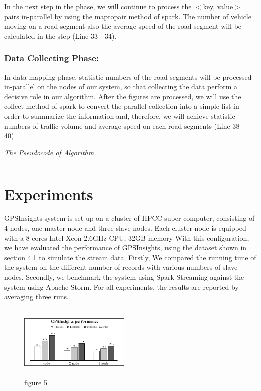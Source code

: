 \documentclass{acm_proc_article-sp}
\begin{document}
\setlength{\parindent}{0.7cm} In the next step in the phase, we will continue to process the $<$key, value$>$ pairs in-parallel by using the maptopair method of spark. The number of vehicle moving on a road segment also the average speed of the road segment will be calculated in the step (Line 33 - 34).

\subsubsection{Data Collecting Phase:} In data mapping phase, statistic numbers of the road segments will be processed in-parallel on the nodes of our system, so that collecting the data perform a decisive role in our algorithm. After the figures are processed, we will use the collect method of spark to convert the parallel collection into a simple list in order to summarize the information and, therefore, we will achieve statistic numbers of traffic volume and average speed on each road segments (Line 38 - 40).


{\it The Pseudocode of Algorithm}	
\begin{verbatim}

\end{verbatim}
%
\noindent

\section{Experiments}
	GPSInsights system is set up on a cluster of HPCC super computer, consisting of 4 nodes, one master node and three slave nodes. Each cluster node is equipped with a  8-cores Intel Xeon 2.6GHz CPU, 32GB memory 
	With this configuration, we have evaluated the performance of GPSInsights, using the dataset shown in section 4.1 to simulate the stream data. Firstly, We compared the running time of the system on the different number of records with various numbers of slave nodes. Secondly, we benchmark the system using Spark Streaming against the system using Apache Storm. For all experiments, the results are reported by averaging three runs. 
	
	
	\begin{figure}
		\centering
		\includegraphics[height=100pt,width=150pt]{thesis-5}
		\caption{figure 5}
	\end{figure}
\end{document}
